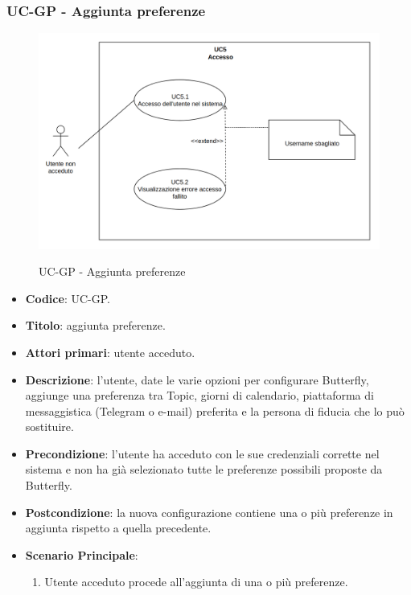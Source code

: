 \subsubsection{UC\theuccount-GP - Aggiunta preferenze}
		\begin{figure}[H]
			\centering
				\includegraphics[width=\columnwidth]{img/UC5.png}\\
			\caption{UC\theuccount-GP - Aggiunta preferenze}
		\end{figure}
	\begin{itemize}
		\item \textbf{Codice}: UC\theuccount-GP.
		\item \textbf{Titolo}: aggiunta preferenze.
		\item \textbf{Attori primari}: utente acceduto.
		\item \textbf{Descrizione}: l’utente, date le varie opzioni per configurare Butterfly, aggiunge una
		preferenza tra Topic, giorni di calendario, piattaforma di messaggistica (Telegram o e-mail)
		preferita e la persona di fiducia che lo può sostituire.
		\item \textbf{Precondizione}: l’utente ha acceduto con le sue credenziali corrette nel sistema e non
		ha già selezionato tutte le preferenze possibili proposte da Butterfly.
		\item \textbf{Postcondizione}: la nuova configurazione contiene una o più preferenze in aggiunta rispetto a quella precedente.
		\item \textbf{Scenario Principale}:
		\begin{enumerate}
			\item Utente acceduto procede all'aggiunta di una o più preferenze.
		\end{enumerate}
	\end{itemize}


